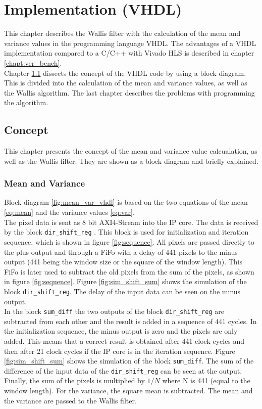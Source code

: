 \section{Implementation (VHDL)} \label{ch:ip:imp_vhdl}
This chapter describes the Wallis filter with the calculation of the mean and
variance values in the programming language VHDL. 
The advantages of a VHDL implementation compared to a C/C++ with Vivado HLS is
described in chapter \ref{chapt:ver_bench}. \\
Chapter \ref{ch:concept_vhdl} dissects the concept of the VHDL code by using a
block diagram. This is divided into the calculation of the mean and variance
values, as well as the Wallis algorithm. The last chapter describes the
problems with programming the algorithm.

\subsection{Concept} \label{ch:concept_vhdl}
This chapter presents the concept of the mean and variance value
calcualation, as well as the Wallis filter. They are shown as a block diagram and briefly explained.

\subsubsection*{Mean and Variance}
Block diagram \ref{fig:mean_var_vhdl} is based on the two equations of the mean 
\ref{eq:mean} and the variance values \ref{eq:var}. \\
The pixel data is sent as 8 bit AXI4-Stream into the IP core. The data is
received by the block \texttt{dir\_shift\_reg} . This block is used for
initialization and iteration sequence, which is shown in figure 
\ref{fig:sequence}. All pixels are passed directly to the plus output and
through a FiFo with a delay of 441 pixels to the minus output (441 being the
window size or the
square of the window length). This FiFo is later used to subtract the
old pixels from the sum of the pixels, as shown in figure \ref{fig:sequence}.
Figure \ref{fig:sim_shift_sum}
shows the simulation of the block \texttt{dir\_shift\_reg}. The delay of the
input data can be seen on the minus output. \\
In the block \texttt{sum\_diff} the two outputs of the block 
\texttt{dir\_shift\_reg} are subtracted from each other and the result is
added in a sequence of 441 cycles. In the initialization sequence, the minus
output is zero and the pixels are only added. This means that a correct result
is obtained after 441 clock cycles and then after 21 clock cycles if the
IP core is in the iteration sequence. Figure \ref{fig:sim_shift_sum} shows the
simulation of the block \texttt{sum\_diff}. The sum of the difference of the
input data of the \texttt{dir\_shift\_reg} can be seen at the output.\\
Finally, the sum of the pixels is multiplied by $1/N$ where N is 441 (equal to
the window length). For the variance, the square mean is subtracted. The mean
and the variance are passed to the Wallis filter.


